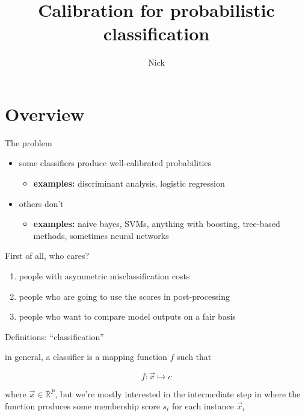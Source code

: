 \documentclass[ignorenonframetext,]{beamer}
\title{Calibration for probabilistic classification}
\subtitle{Nick}
\date{}
\providecommand{\tightlist}{%
\setlength{\itemsep}{0pt}\setlength{\parskip}{0pt}}
\begin{document}
\frame{\titlepage}

\section{Overview}\label{overview}

\begin{frame}{The problem}

\begin{itemize}
\tightlist
\item
  some classifiers produce well-calibrated probabilities

  \begin{itemize}
  \tightlist
  \item
    \textbf{examples:} discriminant analysis, logistic regression
    \vspace{2mm}
  \end{itemize}
\item
  others don't

  \begin{itemize}
  \tightlist
  \item
    \textbf{examples:} naive bayes, SVMs, anything with boosting,
    tree-based methods, sometimes neural networks
  \end{itemize}
\end{itemize}

\end{frame}

\begin{frame}{First of all, who cares?}

\begin{enumerate}
\def\labelenumi{\arabic{enumi}.}
\tightlist
\item
  people with asymmetric misclassification costs
\item
  people who are going to use the scores in post-processing
\item
  people who want to compare model outputs on a fair basis
\end{enumerate}

\end{frame}

\begin{frame}{Definitions: ``classification''}

in general, a classifier is a mapping function \(f\) such that

\[f: \vec{x} \mapsto c\]

where \(\vec{x} \in \mathbb{R}^{P}\), but we're mostly interested in the
intermediate step in where the function produces some membership score
\(s_i\) for each instance \(\vec{x}_i\)

\end{frame}
\end{document}
